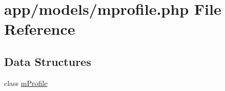 \hypertarget{mprofile_8php}{}\section{app/models/mprofile.php File Reference}
\label{mprofile_8php}
\subsection*{Data Structures}
\begin{DoxyCompactItemize}
\item 
class \hyperlink{classmProfile}{m\+Profile}
\end{DoxyCompactItemize}

